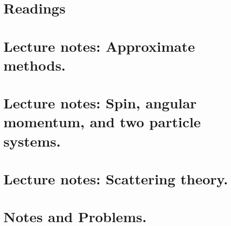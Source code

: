 \part{Readings}


\part{Lecture notes: Approximate methods.}











\part{Lecture notes: Spin, angular momentum, and two particle systems.}










\part{Lecture notes: Scattering theory.}





\part{Notes and Problems.}
















